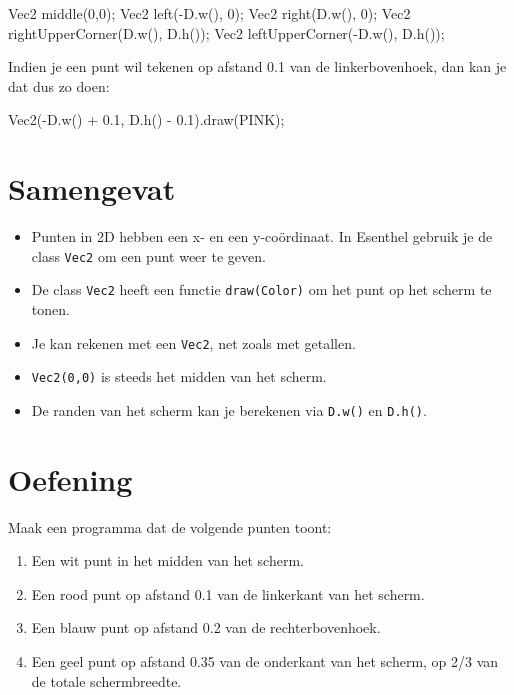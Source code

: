 \begin{code}
Vec2 middle(0,0);
Vec2 left(-D.w(), 0);
Vec2 right(D.w(), 0);
Vec2 rightUpperCorner(D.w(), D.h());
Vec2 leftUpperCorner(-D.w(), D.h());
\end{code}

Indien je een punt wil tekenen op afstand 0.1 van de linkerbovenhoek, dan kan je dat dus zo doen:

\begin{code}
Vec2(-D.w() + 0.1, D.h() - 0.1).draw(PINK);
\end{code}

\section{Samengevat}
\begin{itemize}
\item Punten in 2D hebben een x- en een y-co\"ordinaat. In Esenthel gebruik je de class \texttt{Vec2} om een punt weer te geven.
\item De class \texttt{Vec2} heeft een functie \texttt{draw(Color)} om het punt op het scherm te tonen.
\item Je kan rekenen met een \texttt{Vec2}, net zoals met getallen.
\item \texttt{Vec2(0,0)} is steeds het midden van het scherm.
\item De randen van het scherm kan je berekenen via \texttt{D.w()} en \texttt{D.h()}.
\end{itemize}

\section{Oefening}
Maak een programma dat de volgende punten toont:
\begin{enumerate}
	\item Een wit punt in het midden van het scherm.
	\item Een rood punt op afstand 0.1 van de linkerkant van het scherm.
	\item Een blauw punt op afstand 0.2 van de rechterbovenhoek.
	\item Een geel punt op afstand 0.35 van de onderkant van het scherm, op 2/3 van de totale schermbreedte.
\end{enumerate}

